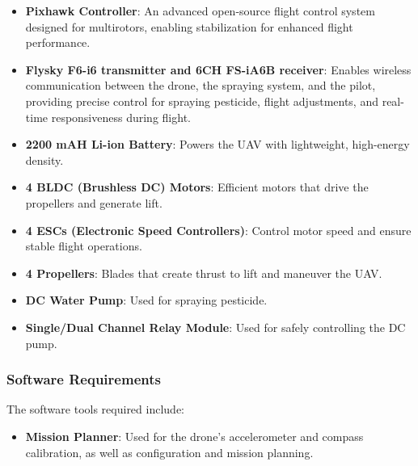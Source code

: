 \begin{itemize}
    \item \textbf{Pixhawk Controller}: An advanced open-source flight control system designed for multirotors, enabling stabilization for enhanced flight performance.
    \item \textbf{Flysky F6-i6 transmitter and 6CH FS-iA6B receiver}: Enables wireless communication between the drone, the spraying system, and the pilot, providing precise control for spraying pesticide, flight adjustments, and real-time responsiveness during flight.
    \item \textbf{2200 mAH Li-ion Battery}: Powers the UAV with lightweight, high-energy density.
    \item \textbf{4 BLDC (Brushless DC) Motors}: Efficient motors that drive the propellers and generate lift.
    \item \textbf{4 ESCs (Electronic Speed Controllers)}: Control motor speed and ensure stable flight operations.
    \item \textbf{4 Propellers}: Blades that create thrust to lift and maneuver the UAV.
    \item \textbf{DC Water Pump}: Used for spraying pesticide.
    \item \textbf{Single/Dual Channel Relay Module}: Used for safely controlling the DC pump.
\end{itemize}
\subsubsection*{Software Requirements}
The software tools required include:

\begin{itemize}
    \item \textbf{Mission Planner}: Used for the drone’s accelerometer and compass calibration, as well as configuration and mission planning.
\end{itemize}


